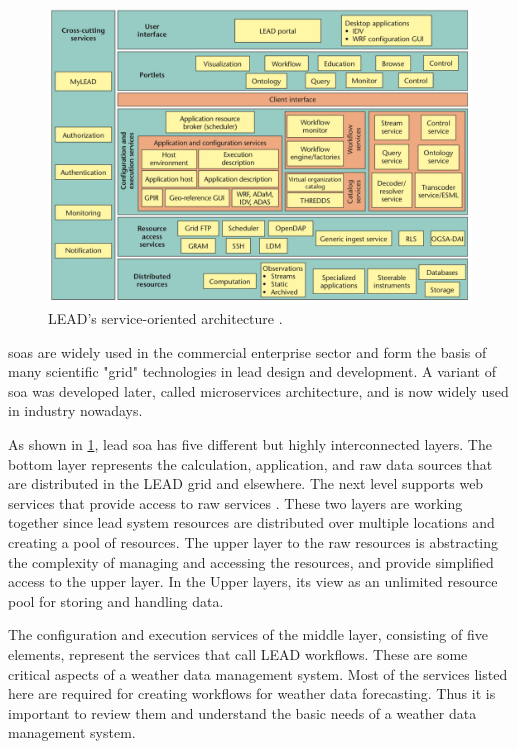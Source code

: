\begin{figure}[htp]
    \centering
    \includegraphics[width=1\textwidth]{lit/lead/LEADs-service-oriented-architecture-A-wide-variety-of-services-and-resources-grouped_W640.png}
    \caption[LEAD's service-oriented architecture]{LEAD's service-oriented architecture \cite{Droegemeier2005Service-OrientedWeather}.}
    \label{fi:lead_soa}
\end{figure}

\acrshort{soa}s are widely used in the commercial enterprise sector and form the basis of many scientific "grid" technologies in lead design and development. A variant of \acrshort{soa} was developed later, called microservices architecture, and is now widely used in industry nowadays.

As shown in \cref{fi:lead_soa}, \acrshort{lead} \acrshort{soa} has five different but highly interconnected layers. The bottom layer represents the calculation, application, and raw data sources that are distributed in the LEAD grid and elsewhere. The next level supports web services that provide access to raw services \cite{Droegemeier2005Service-OrientedWeather}. These two layers are working together since \acrshort{lead} system resources are distributed over multiple locations and creating a pool of resources. The upper layer to the raw resources is abstracting the complexity of managing and accessing the resources, and provide simplified access to the upper layer. In the Upper layers, its view as an unlimited resource pool for storing and handling data.

The configuration and execution services of the middle layer, consisting of five elements, represent the services that call LEAD workflows. These are some critical aspects of a weather data management system. Most of the services listed here are required for creating workflows for weather data forecasting. Thus it is important to review them and understand the basic needs of a weather data management system.

